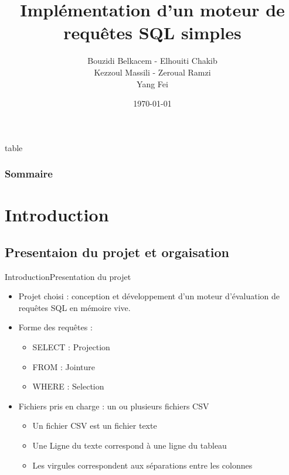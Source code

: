 \documentclass[10pt,handout]{beamer}
\title[Moteur de requêtes SQL]{Implémentation d’un moteur de \\ requêtes SQL simples}
\author[Bouzidi, Elhouiti, Kezzoul, Zeroual, Yang]{Bouzidi Belkacem - Elhouiti Chakib \\ Kezzoul Massili - Zeroual Ramzi \\ Yang Fei}
\institute[]{Université de Montpellier}
\date{\today}
\newif\ifplacelogo %
\begin{document}
\placelogofalse
\begin{frame}
	\titlepage
\end{frame}

\placelogotrue


\begin{frame}{table}
	\frametitle{Sommaire}
	\tableofcontents
\end{frame}

\section{Introduction}

\subsection{Presentaion du projet et orgaisation}

\begin{frame}{Introduction}{Presentation du projet}
\begin{itemize}
  \item Projet choisi : conception et développement d’un moteur d’évaluation de requêtes SQL en mémoire vive.
  \item Forme des requêtes :
  \begin{itemize}
    \item SELECT : Projection
    \item FROM : Jointure
    \item WHERE : Selection
  \end{itemize}
  \item Fichiers pris en charge : un ou plusieurs fichiers CSV
  \begin{itemize}
    \item Un fichier CSV est un fichier texte
    \item Une Ligne du texte correspond à une ligne du tableau
    \item Les virgules correspondent aux séparations entre les colonnes
  \end{itemize}
\end{itemize}
\end{frame}
\end{document}
